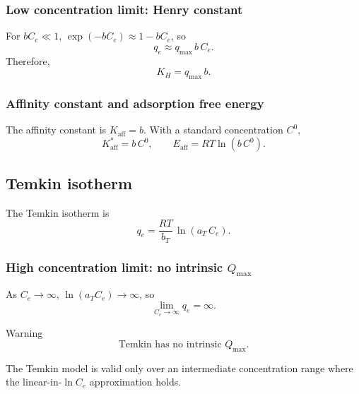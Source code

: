 \documentclass[journal=jacsat,manuscript=article]{achemso}
\begin{document}
\subsubsection{Low concentration limit: Henry constant}

For $bC_e \ll 1$, $\exp(-bC_e) \approx 1 - bC_e$, so
\begin{equation}
	q_e \approx q_{\max}\, b\, C_e.
\end{equation}
Therefore,
\begin{equation}
	\boxed{K_H = q_{\max}\, b.}
\end{equation}

\subsubsection{Affinity constant and adsorption free energy}

The affinity constant is $K_{\mathrm{aff}} = b$. With a standard concentration $C^0$,
\begin{equation}
	\boxed{
		K_{\mathrm{aff}}^{\ast} = b\, C^0,
		\qquad
		E_{\mathrm{aff}} = RT\ln(b\, C^0).
	}
\end{equation}

\subsection{Temkin isotherm}
\label{sec:si_temkin}

The Temkin isotherm is
\begin{equation}
	q_e = \frac{RT}{b_T}\,\ln(a_T\, C_e).
	\label{eq:si_temkin}
\end{equation}

\subsubsection{High concentration limit: no intrinsic $Q_{\max}$}

As $C_e \to \infty$, $\ln(a_T C_e) \to \infty$, so
\begin{equation}
	\lim_{C_e \to \infty} q_e = \infty.
\end{equation}

\begin{redbox}{Warning}
	\begin{equation}
		\text{Temkin has no intrinsic } Q_{\max}.
	\end{equation}
\end{redbox}

The Temkin model is valid only over an intermediate concentration range where the linear-in-$\ln C_e$ approximation holds.
\end{document}
